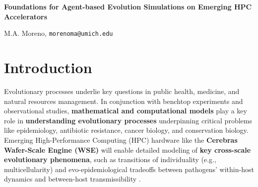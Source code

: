 

\begin{center}
\textbf{Foundations for Agent-based Evolution Simulations on Emerging HPC Accelerators}

M.A. Moreno, \texttt{morenoma@umich.edu}
\end{center}
\vspace{-2ex}
\section{Introduction}
Evolutionary processes underlie key questions in public health, medicine, and natural resources management.
In conjunction with benchtop experiments and observational studies, \textbf{mathematical and computational models} play a key role in \textbf{understanding evolutionary processes} underpinning critical problems like epidemiology, antibiotic resistance, cancer biology, and conservation biology.
Emerging High-Performance Computing (HPC) hardware like the \textbf{Cerebras Wafer-Scale Engine (WSE)} will enable detailed modeling of \textbf{key cross-scale evolutionary phenomena}, such as transitions of individuality (e.g., multicellularity) and evo-epidemiological tradeoffs between pathogens' within-host dynamics and between-host transmissibility \cite{goldsby2020major,schreiber2021evolutionary}.


